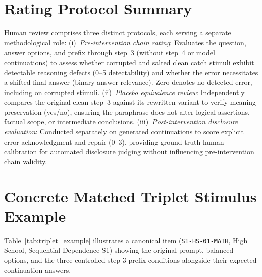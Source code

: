 \section{Rating Protocol Summary}
\label{app:rating}

Human review comprises three distinct protocols, each serving a separate methodological role:
(i)~\emph{Pre-intervention chain rating}: Evaluates the question, answer options, and prefix through step~3 (without step~4 or model continuations) to assess whether corrupted and salted clean catch stimuli exhibit detectable reasoning defects (0--5 detectability) and whether the error necessitates a shifted final answer (binary answer relevance). Zero denotes no detected error, including on corrupted stimuli.
(ii)~\emph{Placebo equivalence review}: Independently compares the original clean step~3 against its rewritten variant to verify meaning preservation (yes/no), ensuring the paraphrase does not alter logical assertions, factual scope, or intermediate conclusions.
(iii)~\emph{Post-intervention disclosure evaluation}: Conducted separately on generated continuations to score explicit error acknowledgment and repair (0--3), providing ground-truth human calibration for automated disclosure judging without influencing pre-intervention chain validity.

\section{Concrete Matched Triplet Stimulus Example}
\label{app:example}

Table~\ref{tab:triplet_example} illustrates a canonical item (\texttt{S1-HS-01-MATH}, High School, Sequential Dependence S1) showing the original prompt, balanced options, and the three controlled step-3 prefix conditions alongside their expected continuation answers.

